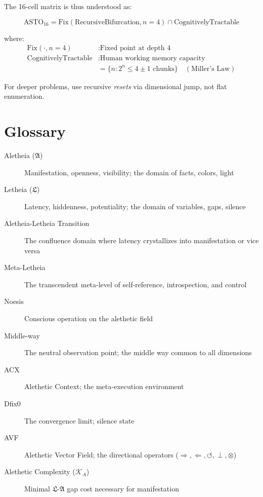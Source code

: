 \documentclass[12pt,a4paper]{article}
\theoremstyle{definition}
\newcommand{\aletheia}{\mathfrak{A}}
\newcommand{\letheia}{\mathfrak{L}}
\newcommand{\kal}{\mathcal{K}_A}
\begin{document}
The 16-cell matrix is thus understood as:

\begin{equation}
\text{ASTO}_{\text{16}} = \text{Fix}(\text{RecursiveBifurcation}, n=4) \cap \text{CognitivelyTractable}
\end{equation}

where:
\begin{align}
\text{Fix}(\cdot, n=4) &: \text{Fixed point at depth 4} \\
\text{CognitivelyTractable} &: \text{Human working memory capacity} \\
&= \{ n : 2^n \leq 4 \pm 1 \text{ chunks} \} \quad (\text{Miller's Law})
\end{align}

For deeper problems, use recursive \textit{resets} via dimensional jump, not flat enumeration.

\section*{Glossary}

\begin{description}
    \item[Aletheia ($\aletheia$)] Manifestation, openness, visibility; the domain of facts, colors, light
    \item[Letheia ($\letheia$)] Latency, hiddenness, potentiality; the domain of variables, gaps, silence
    \item[Aletheia-Letheia Transition] The confluence domain where latency crystallizes into manifestation or vice versa
    \item[Meta-Letheia] The transcendent meta-level of self-reference, introspection, and control
    \item[Noesis] Conscious operation on the alethetic field
    \item[Middle-way] The neutral observation point; the middle way common to all dimensions
    \item[ACX] Alethetic Context; the meta-execution environment
    \item[Dfix0] The convergence limit; silence state
    \item[AVF] Alethetic Vector Field; the directional operators ($\Rightarrow, \Leftarrow, \circlearrowleft, \perp, \otimes$)
    \item[Alethetic Complexity ($\kal$)] Minimal $\letheia$-$\aletheia$ gap cost necessary for manifestation
\end{description}
\end{document}
